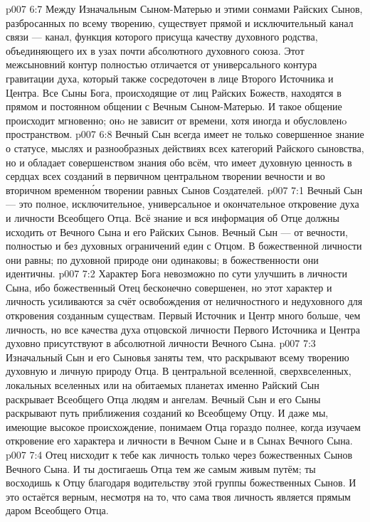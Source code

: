 \vs p007 6:7 \pc Между Изначальным Сыном\hyp{}Матерью и этими сонмами Райских Сынов, разбросанных по всему творению, существует прямой и исключительный канал связи --- канал, функция которого присуща качеству духовного родства, объединяющего их в узах почти абсолютного духовного союза. Этот межсыновний контур полностью отличается от универсального контура гравитации духа, который также сосредоточен в лице Второго Источника и Центра. Все Сыны Бога, происходящие от лиц Райских Божеств, находятся в прямом и постоянном общении с Вечным Сыном\hyp{}Матерью. И такое общение происходит мгновенно; онo не зависит от времени, хотя иногда и обусловленo пространством.
\vs p007 6:8 Вечный Сын всегда имеет не только совершенное знание о статусе, мыслях и разнообразных действиях всех категорий Райского сыновства, но и обладает совершенством знания обо всём, что имеет духовную ценность в сердцах всех созданий в первичном центральном творении вечности и во вторичном временн\'ом творении равных Сынов Создателей.
\vs p007 7:1 Вечный Сын --- это полное, исключительное, универсальное и окончательное откровение духа и личности Всеобщего Отца. Всё знание и вся информация об Отце должны исходить от Вечного Сына и его Райских Сынов. Вечный Сын --- от вечности, полностью и без духовных ограничений един с Отцом. В божественной личности они равны; по духовной природе они одинаковы; в божественности они идентичны.
\vs p007 7:2 Характер Бога невозможно по сути улучшить в личности Сына, ибо божественный Отец бесконечно совершенен, но этот характер и личность усиливаются за счёт освобождения от неличностного и недуховного для откровения созданным существам. Первый Источник и Центр много больше, чем личность, но все качества духа отцовской личности Первого Источника и Центра духовно присутствуют в абсолютной личности Вечного Сына.
\vs p007 7:3 Изначальный Сын и его Сыновья заняты тем, что раскрывают всему творению духовную и личную природу Отца. В центральной вселенной, сверхвселенных, локальных вселенных или на обитаемых планетах именно Райский Сын раскрывает Всеобщего Отца людям и ангелам. Вечный Сын и его Сыны раскрывают путь приближения созданий ко Всеобщему Отцу. И даже мы, имеющие высокое происхождение, понимаем Отца гораздо полнее, когда изучаем откровение его характера и личности в Вечном Сыне и в Сынах Вечного Сына.
\vs p007 7:4 Отец нисходит к тебе как личность только через божественных Сынов Вечного Сына. И ты достигаешь Отца тем же самым живым путём; ты восходишь к Отцу благодаря водительству этой группы божественных Сынов. И это остаётся верным, несмотря на то, что сама твоя личность является прямым даром Всеобщего Отца.
